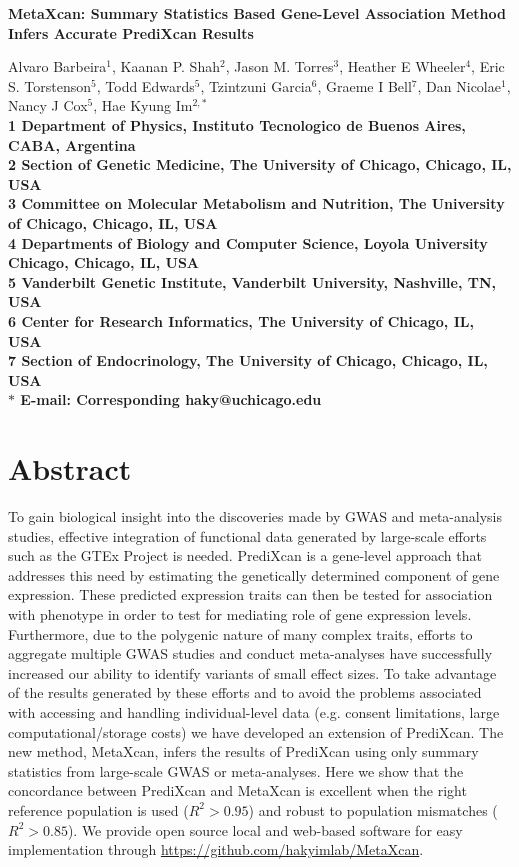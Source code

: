 \documentclass[10pt]{article}
\date{}
\begin{document}
\begin{flushleft}
{\Large
\textbf{MetaXcan: Summary Statistics Based Gene-Level Association Method Infers Accurate PrediXcan Results}
}

Alvaro Barbeira$^{1}$, 
Kaanan P. Shah$^{2}$, 
Jason M. Torres$^3$,
Heather E Wheeler$^4$,
Eric S. Torstenson$^{5}$,
Todd Edwards$^{5}$,
Tzintzuni Garcia$^{6}$,
Graeme I Bell$^{7}$,
Dan Nicolae$^{1}$,
Nancy J Cox$^{5}$,
Hae Kyung Im$^{2,\ast}$
\\
\bf{1} Department of Physics, Instituto Tecnologico de Buenos Aires, CABA, Argentina 
\\
\bf{2} Section of Genetic Medicine, The University of Chicago, Chicago, IL, USA
\\
\bf{3} Committee on Molecular Metabolism and Nutrition, The University of Chicago, Chicago, IL, USA
\\
\bf{4} Departments of Biology and Computer Science, Loyola University Chicago, Chicago, IL, USA
\\
\bf{5} Vanderbilt Genetic Institute, Vanderbilt University, Nashville, TN, USA
\\
\bf{6} Center for Research Informatics, The University of Chicago, IL, USA
\\
\bf{7} Section of Endocrinology, The University of Chicago, Chicago, IL, USA
\\
$\ast$ E-mail: Corresponding haky@uchicago.edu
\end{flushleft}

\section*{Abstract}

To gain biological insight into the discoveries made by GWAS and meta-analysis studies, effective integration of functional data generated by large-scale efforts such as the GTEx Project is needed. PrediXcan is a gene-level approach that addresses this need by estimating the genetically determined component of gene expression. These predicted expression traits can then be tested for association with phenotype in order to test for mediating role of gene expression levels. Furthermore, due to the polygenic nature of many complex traits, efforts to aggregate multiple GWAS studies and conduct meta-analyses have successfully increased our ability to identify variants of small effect sizes. To take advantage of the results generated by these efforts and to avoid the problems associated with accessing and handling individual-level data (e.g. consent limitations, large computational/storage costs) we have developed an extension of PrediXcan. The new method, MetaXcan, infers the results of PrediXcan using only summary statistics from large-scale GWAS or meta-analyses. Here we show that the concordance between PrediXcan and MetaXcan is excellent when the right reference population is used ($R^2 > 0.95$) and robust to population mismatches ($R^2 > 0.85$). We provide open source local and web-based software for easy implementation through \url{https://github.com/hakyimlab/MetaXcan}.
\end{document}
